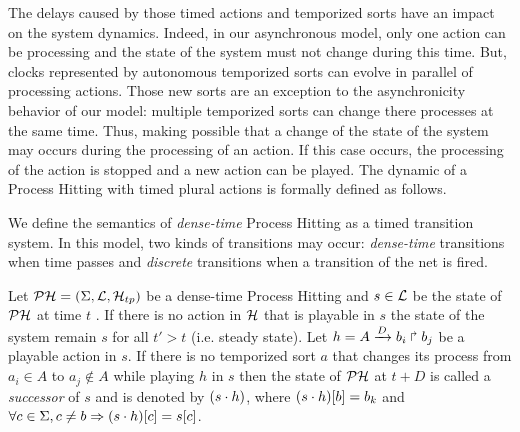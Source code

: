 The delays caused by those timed actions and temporized sorts have an impact on the system dynamics.
Indeed, in our asynchronous model, only one action can be processing and the state of the system must not change during this time.
But, clocks represented by autonomous temporized sorts can evolve in parallel of processing actions.
Those new sorts are an exception to the asynchronicity behavior of our model: multiple temporized sorts can change there processes at the same time.
Thus, making possible that a change of the state of the system may occurs during the processing of an action.
If this case occurs, the processing of the action is stopped and a new action can be played.
The dynamic of a Process Hitting with timed plural actions is formally defined as follows.

We define the semantics of \emph{dense-time} Process Hitting as a timed transition system.
In this model, two kinds of transitions may occur: \emph{dense-time} transitions when time passes and \emph{discrete} transitions when a transition of the net is fired.


\begin{definition}
\label{def:semantic}
Let $\mathcal{PH} = (\Sigma,\mathcal{L},\mathcal{H}_{tp})$ be a dense-time Process Hitting and $s \in \mathcal{L}$ be the state of $\mathcal{PH}$ at time $t$ .
If there is no action in $\mathcal{H}$ that is playable in $s$ the state of the system remain $s$ for all $t' > t$ (i.e. steady state).
Let $h = A\xrightarrow{D} b_i \Rsh b_j$ be a playable action in $s$.
If there is no temporized sort $a$ that changes its process from $a_i \in A$ to $a_j \not \in A$ while playing $h$ in $s$ then the state of $\mathcal{PH}$ at $t+D$
is called a \emph{successor} of $s$ and
is denoted by $(s \cdot h)$,
where ${(s \cdot h)[b]} = b_k$ and
$\forall c \in \Sigma, c \neq b \Rightarrow {(s \cdot h)[c]}={s[c]}$.
\end{definition}

